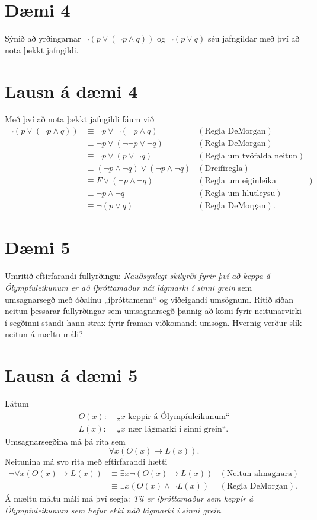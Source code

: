 \documentclass{article}
\begin{document}
\section*{Dæmi 4}
Sýnið að yrðingarnar $\neg(p \lor (\neg p\land q))$ og $\neg (p\lor q)$ séu jafngildar með því að nota þekkt jafngildi.

\section*{Lausn á dæmi 4}
Með því að nota þekkt jafngildi fáum við
\begin{align*}
    \neg(p \lor (\neg p\land q)) &\equiv \neg p \lor \neg(\neg p\land q) & (\text{Regla DeMorgan})\\
    &\equiv \neg p \lor (\neg\neg p\lor \neg q) & (\text{Regla DeMorgan})\\
    &\equiv \neg p \lor (p\lor \neg q) & (\text{Regla um tvöfalda neitun})\\
    &\equiv (\neg p\land \neg q) \lor (\neg p\land \neg q) & (\text{Dreifiregla})\\
    &\equiv F \lor (\neg p\land \neg q) & (\text{Regla um eiginleika neitunar})\\
    &\equiv \neg p\land \neg q & (\text{Regla um hlutleysu})\\
    &\equiv \neg (p\lor q) & (\text{Regla DeMorgan})\text{.}
\end{align*}

\section*{Dæmi 5}
Umritið eftirfarandi fullyrðingu: \emph{Nauðsynlegt skilyrði fyrir því að keppa á Ólympíuleikunum er að íþróttamaður nái lágmarki í sinni grein} sem umsagnarsegð með óðalinu „íþróttamenn“ og viðeigandi umsögnum. Ritið síðan neitun þessarar fullyrðingar sem umsagnarsegð þannig að komi fyrir neitunarvirki í segðinni standi hann strax fyrir framan viðkomandi umsögn. Hvernig verður slík neitun á mæltu máli?

\section*{Lausn á dæmi 5}
Látum
\begin{align*}
    O(x):&\; \text{„$x$ keppir á Ólympíuleikunum“}\\
    L(x):&\; \text{„$x$ nær lágmarki í sinni grein“.}
\end{align*}
Umsagnarsegðina má þá rita sem
\[
\forall x(O(x)\to L(x))\text{.}
\]
Neitunina má svo rita með eftirfarandi hætti
\begin{align*}
    \neg \forall x(O(x)\to L(x)) &\equiv \exists x \neg (O(x)\to L(x)) & (\text{Neitun almagnara})\\
    &\equiv \exists x(O(x)\land \neg L(x)) & (\text{Regla DeMorgan})\text{.}
\end{align*}
Á mæltu máltu máli má því segja: \emph{Til er íþróttamaður sem keppir á Ólympíuleikunum sem hefur ekki náð lágmarki í sinni grein}.
\end{document}
